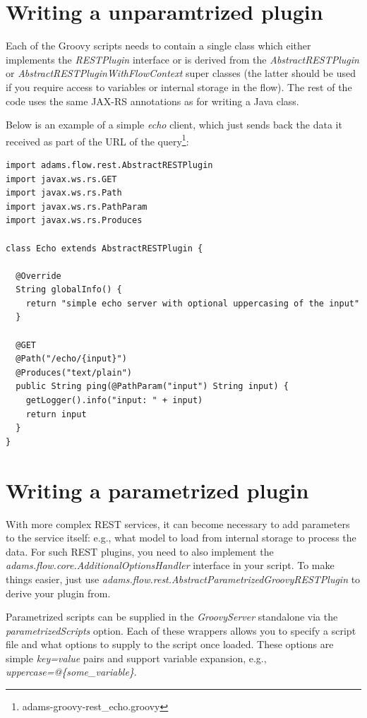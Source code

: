 \documentclass[a4paper]{book}
\begin{document}
\newpage
\section{Writing a unparamtrized plugin}
Each of the Groovy scripts needs to contain a single class which either
implements the \textit{RESTPlugin} interface or is derived from the
\textit{AbstractRESTPlugin} or \textit{AbstractRESTPluginWithFlowContext}
super classes (the latter should be used if you require access to variables or
internal storage in the flow). The rest of the code uses the same JAX-RS annotations
as for writing a Java class.

Below is an example of a simple \textit{echo} client, which just sends
back the data it received as part of the URL of the
query\footnote{adams-groovy-rest\_echo.groovy}:
\begin{verbatim}
import adams.flow.rest.AbstractRESTPlugin
import javax.ws.rs.GET
import javax.ws.rs.Path
import javax.ws.rs.PathParam
import javax.ws.rs.Produces

class Echo extends AbstractRESTPlugin {

  @Override
  String globalInfo() {
    return "simple echo server with optional uppercasing of the input"
  }

  @GET
  @Path("/echo/{input}")
  @Produces("text/plain")
  public String ping(@PathParam("input") String input) {
    getLogger().info("input: " + input)
    return input
  }
}
\end{verbatim}

\newpage
\section{Writing a parametrized plugin}
With more complex REST services, it can become necessary to add parameters
to the service itself: e.g., what model to load from internal storage to
process the data. For such REST plugins, you need to also implement the
\textit{adams.flow.core.AdditionalOptionsHandler} interface in your script.
To make things easier, just use \textit{adams.flow.rest.AbstractParametrizedGroovyRESTPlugin}
to derive your plugin from.

Parametrized scripts can be supplied in the \textit{GroovyServer} standalone via
the \textit{parametrizedScripts} option. Each of these wrappers allows you to
specify a script file and what options to supply to the script once loaded.
These options are simple \textit{key=value} pairs and support variable
expansion, e.g., \textit{uppercase=@\{some\_variable\}}.
\end{document}
